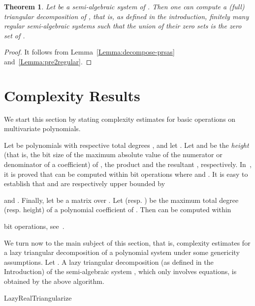 \documentclass{sig-alternate}
\def\S {\ensuremath{\mathfrak{S}}}
\newcommand{\LazyRealTriangularize}[1]{\mbox{{\sf LazyRealTriangularize}}}
\newtheorem{Theorem}{Theorem}
\begin{document}
\begin{Theorem}
\label{Theorem:decompose}
Let  be a semi-algebraic system of .
Then one can compute a (full) triangular decomposition
of , that is, as defined  in the introduction, 
finitely many regular semi-algebraic 
systems such that the union of their zero sets is the 
zero set of .
\end{Theorem}
\begin{proof}
It follows from Lemma~\ref{Lemma:decompose-prsas}
and~\ref{Lemma:pre2regular}.
\end{proof}


\section{Complexity Results}
\label{sec:BPRTD}

We start this section by stating complexity 
estimates for basic operations on multivariate polynomials.

\smallskip{} 
Let  be polynomials with
respective total degrees ,
and let .
Let  and 
be the {\em height}
(that is, the bit size of the maximum absolute value of 
the numerator or denominator of a coefficient) of ,
the product  and the resultant ,  respectively.
In~\cite{DST88}, it is proved that 
 can be computed within  bit operations
where 
and .
It is easy to establish that 
 and  are respectively
upper bounded by 

and 
.
Finally, let 
 be a  matrix over .
Let  (resp. )
be the maximum total degree (resp. height)
of a polynomial coefficient of .
Then  can be computed within 
 
bit operations, see~\cite{HS98}.


We turn now to the main subject of this section,
that is, complexity estimates for 
a lazy triangular decomposition of a polynomial system
under some genericity assumptions.
Let . 
A lazy triangular decomposition (as defined in the Introduction) of 
the semi-algebraic system , 
which only involves equations,
is obtained by the above
algorithm.

\begin{algorithm}
\dontprintsemicolon
\linesnumbered
\caption{\LazyRealTriangularize{\S}
\label{Algo::3-step}}
\; 
\end{algorithm}
\end{document}
